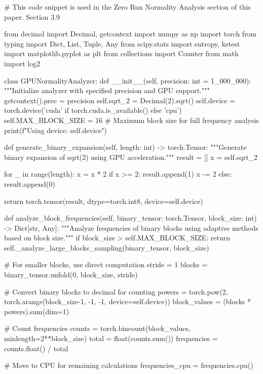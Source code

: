 # This code snippet is used in the Zero Run Normality Analysis section of this paper. Section 3.9

from decimal import Decimal, getcontext
import numpy as np
import torch
from typing import Dict, List, Tuple, Any
from scipy.stats import entropy, kstest
import matplotlib.pyplot as plt
from collections import Counter
from math import log2

class GPUNormalityAnalyzer:
    def __init__(self, precision: int = 1_000_000):
        """Initialize analyzer with specified precision and GPU support."""
        getcontext().prec = precision
        self.sqrt_2 = Decimal(2).sqrt()
        self.device = torch.device('cuda' if torch.cuda.is_available() else 'cpu')
        self.MAX_BLOCK_SIZE = 16  # Maximum block size for full frequency analysis
        print(f"Using device: {self.device}")
        
    def generate_binary_expansion(self, length: int) -> torch.Tensor:
        """Generate binary expansion of sqrt(2) using GPU acceleration."""
        result = []
        x = self.sqrt_2
        
        for _ in range(length):
            x = x * 2
            if x >= 2:
                result.append(1)
                x -= 2
            else:
                result.append(0)
                
        return torch.tensor(result, dtype=torch.int8, device=self.device)

    def analyze_block_frequencies(self, binary_tensor: torch.Tensor, block_size: int) -> Dict[str, Any]:
        """Analyze frequencies of binary blocks using adaptive methods based on block size."""
        if block_size > self.MAX_BLOCK_SIZE:
            return self._analyze_large_blocks_sampling(binary_tensor, block_size)
        
        # For smaller blocks, use direct computation
        stride = 1
        blocks = binary_tensor.unfold(0, block_size, stride)
        
        # Convert binary blocks to decimal for counting
        powers = torch.pow(2, torch.arange(block_size-1, -1, -1, device=self.device))
        block_values = (blocks * powers).sum(dim=1)
        
        # Count frequencies
        counts = torch.bincount(block_values, minlength=2**block_size)
        total = float(counts.sum())
        frequencies = counts.float() / total
        
        # Move to CPU for remaining calculations
        frequencies_cpu = frequencies.cpu()
        
